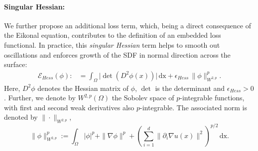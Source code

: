 \documentclass[12pt,openany]{book}
\theoremstyle{plainnormal}
\theoremstyle{remark}
\begin{document}
\paragraph{Singular Hessian:}
We further propose an additional loss term, which, being a direct consequence of the Eikonal equation, contributes to the definition of an embedded loss functional. In practice, this \emph{singular Hessian} term helps to smooth out oscillations and enforces growth of the SDF in normal direction across the surface: 
\begin{align}\label{loss_Hess}
    \mathcal{E}_{Hess}({\phi}) :&=   \int_\Omega \big|\det(D^2 \phi(x))\big| \,\mathrm{dx} + \epsilon_{Hess}\, \|\phi\|_{W^{2,p}}^p  .
\end{align}
Here, $D^2 \phi$ denotes the Hessian matrix of $\phi$, $\det$ is the determinant and $\epsilon_{Hess} > 0$. Further, we denote by \( W^{2,p}(\Omega) \) the Sobolev space of $p$-integrable functions, with first and second weak derivatives also \( p \)-integrable. The associated norm is denoted by \( \|\cdot\|_{W^{2,p}} \), $$\|\phi\|^p_{W^{2,p}} :=\int_\Omega |\phi|^p + \|\nabla \phi\|^p + \left( \sum_{i=1}^d \| \partial_i \nabla u(x) \|^2 \right)^{p/2} \, \mathrm{dx}.$$
\end{document}

